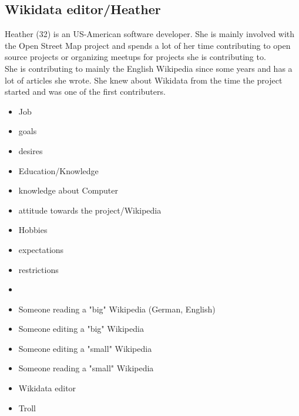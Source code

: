 \documentclass[11pt]{article}
\begin{document}
\subsection{Wikidata editor/Heather}
Heather (32) is an US-American software developer. She is mainly involved with the Open Street Map project and spends a lot of her time contributing to open source projects or organizing meetups for projects she is contributing to. \\
She is contributing to mainly the English Wikipedia since some years and has a lot of articles she wrote. 
She knew about Wikidata from the time the project started and was one of the first contributers. 

\begin{itemize}
\item Job
\item goals
\item desires
\item Education/Knowledge
\item knowledge about Computer
\item attitude towards the project/Wikipedia
\item Hobbies
\item expectations
\item restrictions

\item
\item Someone reading a "big" Wikipedia (German, English)
\item Someone editing a "big" Wikipedia
\item Someone editing a "small" Wikipedia
\item Someone reading a "small" Wikipedia 
\item Wikidata editor
\item Troll
\end{itemize}
\end{document}
